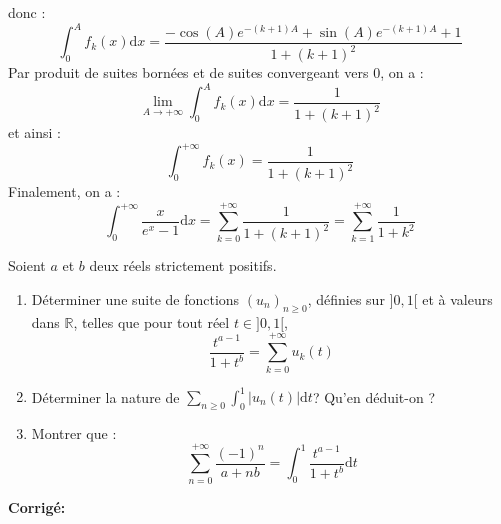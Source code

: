\documentclass[a4paper,twoside,french,10pt]{VcCours}
\newcommand{\dx}{\text{d}x}
\newcommand{\dt}{\text{d}t}
\newcommand{\corr}{\textbf{Corrigé:}}
\begin{document}
donc :
$$\int_0^A f_k(x) \dx = \dfrac{-\cos(A)e^{-(k+1)A}+ \sin(A)e^{-(k+1)A}+1}{1+(k+1)^2}$$
Par produit de suites bornées et de suites convergeant vers $0$, on a :
$$ \lim_{A \rightarrow + \infty} \int_0^A f_k(x) \dx = \dfrac{1}{1+(k+1)^2}$$
et ainsi :
$$ \int_0^{+ \infty} f_k(x)  = \dfrac{1}{1+(k+1)^2}$$
Finalement, on a :
$$ \int_0^{+ \infty} \dfrac{x}{e^x-1} \dx = \sum_{k=0}^{+ \infty} \dfrac{1}{1+(k+1)^2} =  \sum_{k=1}^{+ \infty} \dfrac{1}{1+k^2}$$

\begin{Exercice}{} Soient $a$ et $b$ deux réels strictement positifs.
\begin{enumerate}
\item Déterminer une suite de fonctions $(u_n)_{n \geq 0}$, définies sur $]0,1[$ et à valeurs dans $\mathbb{R}$, telles que pour tout réel $t \in ]0,1[$,
$$ \dfrac{t^{a-1}}{1+t^b} = \sum_{k=0}^{+ \infty} u_k(t)$$
\item Déterminer la nature de $\sum_{n \geq 0} \int_0^1 \vert u_n(t) \vert \dt$? Qu'en déduit-on ?
\item Montrer que :
$$ \sum_{n=0}^{+ \infty} \dfrac{(-1)^n}{a+nb} = \int_0^1 \dfrac{t^{a-1}}{1+t^b} \dt$$
\end{enumerate}
\end{Exercice}

\corr 
\end{document}
